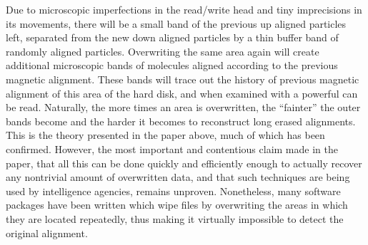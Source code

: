 Due to microscopic imperfections in the read/write head and tiny imprecisions in its movements, there will be a small band of the previous up aligned particles left, separated from the new down aligned particles by a thin buffer band of randomly aligned particles. Overwriting the same area again will create additional microscopic bands of molecules aligned according to the previous magnetic alignment. These bands will trace out the history of previous magnetic alignment of this area of the hard disk, and when examined with a powerful  can be read. Naturally, the more times an area is overwritten, the ``fainter'' the outer bands become and the harder it becomes to reconstruct long erased alignments. \\

This is the theory presented in the paper above, much of which has been confirmed. However, the most important and contentious claim made in the paper, that all this can be done quickly and efficiently enough to actually recover any nontrivial amount of overwritten data, and that such techniques are being used by intelligence agencies, remains unproven. Nonetheless, many software packages have been written which wipe files by overwriting the areas in which they are located repeatedly, thus making it virtually impossible to detect the original alignment. \\

